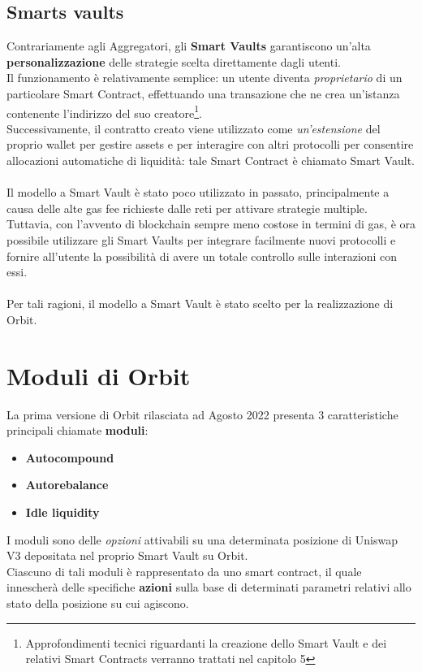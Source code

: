 \documentclass[12pt,a4paper]{report}
\begin{document}
\subsection{Smarts vaults}

Contrariamente agli Aggregatori, gli \textbf{Smart Vaults} garantiscono un'alta \textbf{personalizzazione} delle strategie scelta direttamente dagli utenti.
\\Il funzionamento è relativamente semplice: un utente diventa \textit{proprietario} di un particolare Smart Contract, effettuando una transazione che ne crea un'istanza contenente l'indirizzo del suo creatore\footnote{Approfondimenti tecnici riguardanti la creazione dello Smart Vault e dei relativi Smart Contracts verranno trattati nel capitolo 5}.
\\Successivamente, il contratto creato viene utilizzato come \textit{un'estensione} del proprio wallet per gestire assets e per interagire con altri protocolli per consentire allocazioni automatiche di liquidità: tale Smart Contract è chiamato Smart Vault.
\\\\Il modello a Smart Vault è stato poco utilizzato in passato, principalmente a causa delle alte gas fee richieste dalle reti per attivare strategie multiple.
\\Tuttavia, con l'avvento di blockchain sempre meno costose in termini di gas, è ora possibile utilizzare gli Smart Vaults per integrare facilmente nuovi protocolli e fornire all'utente la possibilità di avere un totale controllo sulle interazioni con essi.
\\\\Per tali ragioni, il modello a Smart Vault è stato scelto per la realizzazione di Orbit.

\section{Moduli di Orbit}
\label{modules}

La prima versione di Orbit rilasciata ad Agosto 2022 presenta 3 caratteristiche principali chiamate \textbf{moduli}: 

\begin{itemize}
  \item \textbf{Autocompound}
  \item \textbf{Autorebalance}
  \item \textbf{Idle liquidity}
\end{itemize}
\textbf{\list}
\noindent I moduli sono delle \textit{opzioni} attivabili su una determinata posizione di Uniswap V3 depositata nel proprio Smart Vault su Orbit. \\Ciascuno di tali moduli è rappresentato da uno smart contract, il quale innescherà delle specifiche \textbf{azioni} sulla base di determinati parametri relativi allo stato della posizione su cui agiscono.
\end{document}

